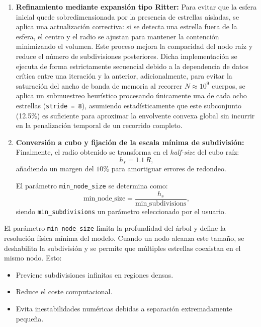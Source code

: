 \begin{enumerate}
    La búsqueda de la distancia máxima también se paraleliza mediante \texttt{OpenMP} con reducción \texttt{max}, aprovechando que cada comparación es independiente de las demás.
    \item \textbf{Refinamiento mediante expansión tipo Ritter:}
    Para evitar que la esfera inicial quede sobredimensionada por la presencia de estrellas aisladas, se aplica una actualización correctiva: si se detecta una estrella fuera de la esfera, el centro y el radio se ajustan para mantener la contención minimizando el volumen.
    Este proceso mejora la compacidad del nodo raíz y reduce el número de subdivisiones posteriores.
    Dicha implementación se ejecuta de forma estrictamente secuencial debido a la dependencia de datos crítica entre una iteración y la anterior, adicionalmente, para evitar la saturación del ancho de banda de memoria al recorrer $N \approx 10^9$ cuerpos, se aplica un submuestreo heurístico procesando únicamente una de cada ocho estrellas (\texttt{stride = 8}), asumiendo estadísticamente que este subconjunto (12.5\%) es suficiente para aproximar la envolvente convexa global sin incurrir en la penalización temporal de un recorrido completo.
    \item \textbf{Conversión a cubo y fijación de la escala mínima de subdivisión:}
    Finalmente, el radio obtenido se transforma en el \emph{half-size} del cubo raíz:
    \[
        h_s = 1.1 \, R,
    \]
    añadiendo un margen del $10\%$ para amortiguar errores de redondeo.

    El parámetro \texttt{min\_node\_size} se determina como:
    \[
        \text{min\_node\_size} = \frac{h_s}{\text{min\_subdivisions}},
    \]
    siendo \texttt{min\_subdivisions} un parámetro seleccionado por el usuario.
\end{enumerate}
El parámetro \texttt{min\_node\_size} limita la profundidad del árbol y define la resolución física mínima del modelo.
Cuando un nodo alcanza este tamaño, se deshabilita la subdivisión y se permite que múltiples estrellas coexistan en el mismo nodo.
Esto:
\begin{itemize}
    \item Previene subdivisiones infinitas en regiones densas.
    \item Reduce el coste computacional.
    \item Evita inestabilidades numéricas debidas a separación extremadamente pequeña.
\end{itemize}

